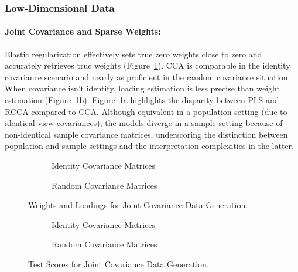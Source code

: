 \subsubsection{Low-Dimensional Data}

\paragraph{Joint Covariance and Sparse Weights:} Elastic regularization effectively sets true zero weights close to zero and accurately retrieves true weights (Figure~\ref{fig:joint-identity-weights-loadings}). CCA is comparable in the identity covariance scenario and nearly as proficient in the random covariance situation.
When covariance isn't identity, loading estimation is less precise than weight estimation (Figure~\ref{fig:joint-identity-weights-loadings}b).
Figure~\ref{fig:joint-identity-weights-loadings}a highlights the disparity between PLS and RCCA compared to CCA.
Although equivalent in a population setting (due to identical view covariances), the models diverge in a sample setting because of non-identical sample covariance matrices, underscoring the distinction between population and sample settings and the interpretation complexities in the latter.

\begin{figure}
\centering
\begin{subfigure}{0.49\linewidth}
\centering

\caption{Identity Covariance Matrices}
\end{subfigure}
%
\begin{subfigure}{0.49\linewidth}
\centering

\caption{Random Covariance Matrices}
\end{subfigure}
\caption{Weights and Loadings for Joint Covariance Data Generation.}\label{fig:joint-identity-weights-loadings}
\end{figure}

\begin{figure}
\centering
\begin{subfigure}{0.49\linewidth}
\centering

\caption{Identity Covariance Matrices}
\end{subfigure}
%
\begin{subfigure}{0.49\linewidth}
\centering

\caption{Random Covariance Matrices}
\end{subfigure}
\caption{Test Scores for Joint Covariance Data Generation.}\label{fig:joint-scores}
\end{figure}

